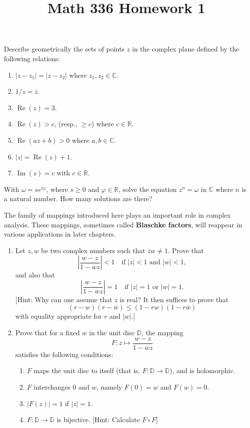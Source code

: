 \documentclass{article}
\title{Math 336 Homework 1}
\newcommand\R{\ensuremath{\mathbb{R}}}
\newcommand\C{\ensuremath{\mathbb{C}}}
\newcommand\D{\ensuremath{\mathbb{D}}}
\newcommand{\re}{\operatorname{Re}}
\newcommand{\im}{\operatorname{Im}}
\begin{document}
\maketitle
\begin{problem}
Describe geometrically the sets of points $z$ in the complex plane defined by the
following relations:
\begin{enumerate}[label=(\alph*)]
	\item $|z-z_1| = |z-z_2|$ where $z_1,z_2\in \C$.
	\item $1 / z = \overline{z}$.
	\item $\re(z)=3$.
	\item $\re(z)>c$, (resp., $\ge c$) where $c\in \R$.
	\item $\re(az+b)>0$ where $a,b \in \C$.
	\item $|z| =\re(z)+1$.
	\item $\im(z)=c$ with $c \in \R$.
\end{enumerate}
\end{problem}
\begin{problem}
With $\omega = se^{i\varphi}$, where $s\ge 0$ and $\varphi \in \R$, solve the equation $z^n = \omega$ in $\C$ where $n$ is a natural number.
How many solutions are there?
\end{problem}
\begin{problem}
The family of mappings introduced here plays an important role in complex
analysis.
These mappings, sometimes called \textbf{Blaschke factors}, will reappear in
various applications in later chapters.
\begin{enumerate}[label = (\alph*)]
	\item Let $z,w$ be two complex numbers such that  $\overline{z} w \neq 1$.
	      Prove that \[
		      \left| \frac{w-z}{1-\overline{w}z} \right| <1\quad \text{if } |z|<1 \text{ and } |w| < 1
		      ,\] and also that \[
		      \left| \frac{w-z}{1-\overline{w}z} \right| =1\quad \text{if } |z|=1 \text{ or } |w| = 1
		      .\]
	      [Hint: Why can one assume that $z$ is real?
	      It then suffices to prove that  \[
		      (r-w)(r-\overline{w})\le (1-rw)(1-r\overline{w})
	      \] with equality appropriate for $r$ and  $|w|$.]
	\item Prove that for a fixed $w$ in the unit disc  $\D$, the mapping \[
		      F: z \mapsto \frac{w-z}{1-\overline{w}z}
	      \] satisfies the following conditions:
	      \begin{enumerate}[label = (\roman*)]
		      \item $F$ maps the unit disc to itself (that is, $F:\D \to \D$), and is holomorphic.
		      \item $F$ interchanges 0 and $w$, namely $F(0)=w$ and $F(w)=0$.
		      \item $|F(z)| = 1$ if $|z| = 1$.
		      \item $F:\D \to \D$ is bijective.
			            [Hint: Calculate $F \circ F$]
	      \end{enumerate}
\end{enumerate}
\end{problem}
\end{document}
